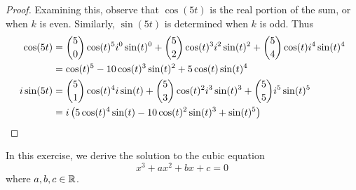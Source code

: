 \documentclass{exam}
\begin{document}
\begin{questions}
\begin{proof}
        Examining this, observe that $\cos(5t)$ is the real portion of the sum, or when $k$ is even. Similarly, $\sin(5t)$ is determined when $k$ is odd. Thus
        \begin{align*}
            \cos(5t) &= \binom{5}{0}\cos(t)^5i^0\sin(t)^0 + \binom{5}{2}\cos(t)^3i^2\sin(t)^2 + \binom{5}{4}\cos(t)i^4\sin(t)^4 \\
            &= \cos(t)^5 - 10\cos(t)^3\sin(t)^2 + 5\cos(t)\sin(t)^4 \\
            i\sin(5t) &= \binom{5}{1}\cos(t)^4i\sin(t) +  \binom{5}{3}\cos(t)^2i^3\sin(t)^3 + \binom{5}{5}i^5\sin(t)^5 \\
            &= i\left( 5\cos(t)^4\sin(t) - 10\cos(t)^2\sin(t)^3 + \sin(t)^5 \right)
        \end{align*}
    \end{proof}



    \newpage
    \question In this exercise, we derive the solution to the cubic equation
    \begin{equation}x^3 + ax^2 + bx + c = 0\end{equation}
    where $a,b,c\in\mathbb {R}$.

\end{questions}
\end{document}
